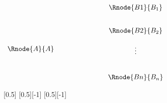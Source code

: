 

$
\begin{array}{c p{2.0cm} c p{2.0cm} c}				
                   &&	 \Rnode{B1}{B_1}  \\ [0.75cm]
									 &&  \Rnode{B2}{B_2}  \\ [0.5cm]
		\Rnode{A}{A}  &&                    \\ [-0.5cm]
				           &&       \vdots      \\ [0.85cm]
                   &&	 \Rnode{Bn}{B_n}  
\end{array}
$
\begin{arrows}
[0.5]
[0.5][-1]
[0.5][-1]
\end{arrows}

